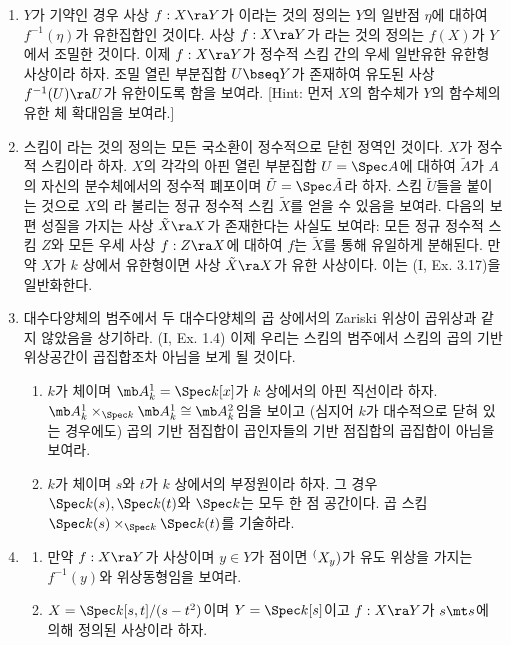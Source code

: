 \begin{enumerate}[label=\tb{3.\arabic*.},itemindent=0mm,itemsep=2mm]
	\item $Y$가 기약인 경우 사상 $f:X\ra Y$가 이라는 것의 정의는
	$Y$의 일반점 $\eta$에 대하여 $f^{-1}(\eta)$가 유한집합인 것이다.
	사상 $f:X\ra Y$가 라는 것의 정의는 $f(X)$가 $Y$에서 조밀한 것이다.
	이제 $f:X\ra Y$가 정수적 스킴 간의 우세 일반유한 유한형 사상이라 하자.
	조밀 열린 부분집합 $U\bseq Y$가 존재하여 유도된 사상 $f^{-1}(U)\ra U$가 유한이도록 함을 보여라.
	[Hint: 먼저 $X$의 함수체가 $Y$의 함수체의 유한 체 확대임을 보여라.]
	\item {} 스킴이 라는 것의 정의는 모든 국소환이 정수적으로 닫힌 정역인 것이다.
	$X$가 정수적 스킴이라 하자. $X$의 각각의 아핀 열린 부분집합 $U=\Spec A$에 대하여
	$\tilde A$가 $A$의 자신의 분수체에서의 정수적 폐포이며 $\tilde U=\Spec\tilde A$라 하자.
	스킴 $\tilde U$들을 붙이는 것으로 $X$의 라 불리는 정규 정수적 스킴 $\tilde X$를 얻을 수 있음을 보여라.
	다음의 보편 성질을 가지는 사상 $\tilde X\ra X$가 존재한다는 사실도 보여라:
	모든 정규 정수적 스킴 $Z$와 모든 우세 사상 $f:Z\ra X$에 대하여 $f$는 $\tilde X$를 통해 유일하게 분해된다.
	만약 $X$가 $k$ 상에서 유한형이면 사상 $\tilde X\ra X$가 유한 사상이다. 이는 (I, Ex. 3.17)을 일반화한다.
	\item {} 대수다양체의 범주에서 두 대수다양체의 곱 상에서의 Zariski 위상이 곱위상과 같지 않았음을 상기하라.
	(I, Ex. 1.4) 이제 우리는 스킴의 범주에서 스킴의 곱의 기반 위상공간이 곱집합조차 아님을 보게 될 것이다.
	\begin{enumerate}[label=(\alph*)]
	\item $k$가 체이며 $\mb A^1_k=\Spec k[x]$가 $k$ 상에서의 아핀 직선이라 하자.
	$\mb A^1_k\times_{\Spec k}\mb A^1_k\cong\mb A^2_k$임을 보이고
	(심지어 $k$가 대수적으로 닫혀 있는 경우에도) 곱의 기반 점집합이 곱인자들의 기반 점집합의 곱집합이 아님을 보여라.
	\item $k$가 체이며 $s$와 $t$가 $k$ 상에서의 부정원이라 하자. 그 경우 $\Spec k(s),\Spec k(t)$와 $\Spec k$는 모두 한 점 공간이다.
	곱 스킴 $\Spec k(s)\times_{\Spec k}\Spec k(t)$를 기술하라.
	\end{enumerate}
	\item {}
	\begin{enumerate}[label=(\alph*)]
	\item 만약 $f:X\ra Y$가 사상이며 $y\in Y$가 점이면 $\sp(X_y)$가 유도 위상을 가지는 $f^{-1}(y)$와 위상동형임을 보여라.
	\item $X=\Spec k[s,t]/(s-t^2)$이며 $Y=\Spec k[s]$이고 $f:X\ra Y$가 $s\mt s$에 의해 정의된 사상이라 하자.

\end{enumerate}
\end{enumerate}
